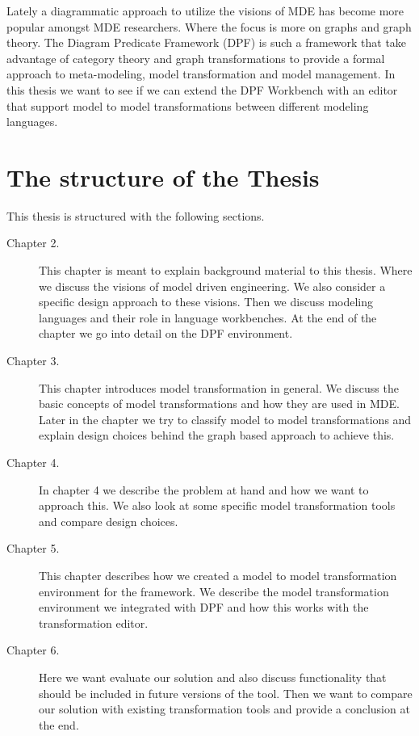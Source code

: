 Lately a diagrammatic approach to utilize the visions of MDE has become more
popular amongst MDE researchers. Where the focus is more on graphs and graph
theory. The Diagram Predicate Framework (DPF) is such a framework that take
advantage of category theory and graph transformations to provide a formal
approach to meta-modeling, model transformation and model management. In this
thesis we want to see if we can extend the DPF Workbench with an editor that
support model to model transformations between different modeling languages.

\section{The structure of the Thesis}

This thesis is structured with the following sections.

\begin{description}
  \item[Chapter 2.] This chapter is meant to explain background material to this
  thesis. Where we discuss the visions of model driven engineering. We also
  consider a specific design approach to these visions. Then we discuss modeling
  languages and their role in language workbenches. At the end of the chapter we
  go into detail on the DPF environment. 
  
  \item[Chapter 3.] This chapter introduces model transformation in general. We
  discuss the basic concepts of model transformations and how they are used in
  MDE. Later in the chapter we try to classify model to model transformations
  and explain design choices behind the graph based approach to achieve this.
  
  
  \item[Chapter 4.] In chapter 4 we describe the problem at hand and how we want
  to approach this. We also look at some specific model transformation tools and
  compare design choices. 
  
  
  \item[Chapter 5.] This chapter describes how we created a model
  to model transformation environment for the framework. We describe the model
  transformation environment we integrated with DPF and how this works with the
  transformation editor. 
  
  
  \item[Chapter 6.] Here we want evaluate our solution and also discuss
  functionality that should be included in future versions of the tool. Then we
  want to compare our solution with existing transformation tools and provide a
  conclusion at the end. 
\end{description}